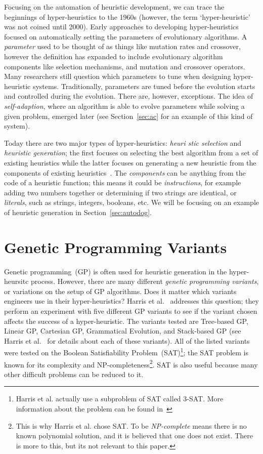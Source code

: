 \documentclass{sig-alternate}
\begin{document}
Focusing on the automation of heuristic development, we can trace the beginnings of hyper-heuristics to the 1960s (however, the term `hyper-heuristic' was not coined until 2000). Early approaches to developing hyper-heuristics focused on automatically setting the parameters of evolutionary algorithms. A \textit{parameter} used to be thought of as things like mutation rates and crossover, however the definition has expanded to include evolutionary algorithm components like selection mechanisms, and mutation and crossover operators. Many researchers still question which parameters to tune when designing hyper-heuristic systems. Traditionally, parameters are tuned before the evolution starts and controlled during the evolution. There are, however, exceptions. The idea of \textit{self-adaption}, where an algorithm is able to evolve parameters while solving a given problem, emerged later (see Section~\ref{sec:ac} for an example of this kind of system).~\cite{pappa:2014}

Today there are two major types of hyper-heuristics: \textit{heuri\- stic selection} and \textit{heuristic generation}; the first focuses on selecting the best algorithm from a set of existing heuristics while the latter focuses on generating a new heuristic from the components of existing heuristics~\cite{pappa:2014}. The \textit{components} can be anything from the code of a heuristic function; this means it could be \textit{instructions}, for example adding two numbers together or determining if two strings are identical, or \textit{literals}, such as strings, integers, booleans, etc. We will be focusing on an example of heuristic generation in Section~\ref{sec:autodog}.

\section{Genetic Programming Variants}
\label{sec:gpvariants}
Genetic programming~(GP) is often used for heuristic generation in the hyper-heursitc process. However, there are many different \textit{genetic programming variants}, or variations on the setup of GP algorithms. Does it matter which variants engineers use in their hyper-heuristics? Harris et al.~\cite{harris:2015} addresses this question; they perform an experiment with five different GP variants to see if the variant chosen affects the success of a hyper-heuristic. The variants tested are Tree-based GP, Linear GP, Cartesian GP, Grammatical Evolution, and Stack-based GP (see Harris et al.~\cite{harris:2015} for details about each of these variants). All of the listed variants were tested on the Boolean Satisfiability Problem~(SAT)\footnote{Harris et al. actually use a subproblem of SAT called 3-SAT. More information about the problem can be found in~\cite{harris:2015}}; the SAT problem is known for its complexity and NP-compl\-eteness\footnote{This is why Harris et al. chose SAT. To be \textit{NP-complete} means there is no known polynomial solution, and it is believed that one does not exist. There is more to this, but its not relevant to this paper.}. SAT is also useful because many other difficult problems can be reduced to it. 
\end{document}
